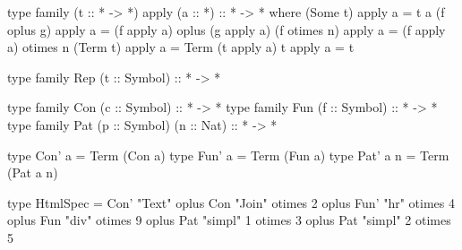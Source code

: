 \begin{code}
type family (t :: * -> *) apply (a :: *) :: * -> *  where
  (Some t)      apply  a  = t a
  (f oplus g)   apply  a  = (f apply a) oplus (g apply a)
  (f otimes n)  apply  a  = (f apply a) otimes n
  (Term t)      apply  a  = Term (t apply a)
  t             apply  a  = t
\end{code}

\begin{code}
type family Rep (t :: Symbol) :: * -> *

type family Con (c :: Symbol) :: * -> *
type family Fun (f :: Symbol) :: * -> *
type family Pat (p :: Symbol) (n :: Nat) :: * -> *

type Con' a    = Term  (Con a)
type Fun' a    = Term  (Fun a)
type Pat' a n  = Term  (Pat a n)
\end{code}

\begin{code}
type HtmlSpec
  =      Con'  "Text"
  oplus  Con   "Join"      otimes 2
  oplus  Fun'  "hr"        otimes 4
  oplus  Fun   "div"       otimes 9
  oplus  Pat   "simpl"  1  otimes 3
  oplus  Pat   "simpl"  2  otimes 5
\end{code}